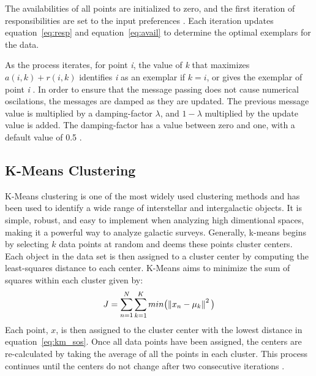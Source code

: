 The availabilities of all points are initialized to zero, and the first iteration of responsibilities are set to the input preferences \citet{frey07}. 
Each iteration updates equation~\ref{eq:resp} and equation~\ref{eq:avail} to determine the optimal exemplars for the data.

As the process iterates, for point \textit{i}, the value of \textit{k} that maximizes $a(i,k) + r(i,k)$ identifies \textit{i} as an exemplar if $k=i$, or gives the exemplar of point \textit{i} \citet{frey07}.
In order to ensure that the message passing does not cause numerical oscilations, the messages are damped as they are updated.
The previous message value is multiplied by a damping-factor $\lambda$, and $1 - \lambda$ multiplied by the update value is added.
The damping-factor has a value between zero and one, with a default value of 0.5 \citet{frey07}.

\subsection{K-Means Clustering}
K-Means clustering is one of the most widely used clustering methods and has been used to identify a wide range of interstellar and intergalactic objects. %
It is simple, robust, and easy to implement when analyzing high dimentional spaces, making it a powerful way to analyze galactic surveys. 
Generally, k-means begins by selecting $k$ data points at random and deems these points cluster centers.
Each object in the data set is then assigned to a cluster center by computing the least-squares distance to each center.
K-Means aims to minimize the sum of squares within each cluster given by:
\begin{equation}
\label{eq:km_sos}
J = \sum_{n=1}^N \sum_{k=1}^K min \big( \norm{x_n - \mu_k}^2 \big)
\end{equation}
Each point, $x$, is then assigned to the cluster center with the lowest distance in equation~\ref{eq:km_sos}\citet{tammour16}.
Once all data points have been assigned, the centers are re-calculated by taking the average of all the points in each cluster. 
This process continues until the centers do not change after two consecutive iterations \citet{sanchez-almeida13}. 

